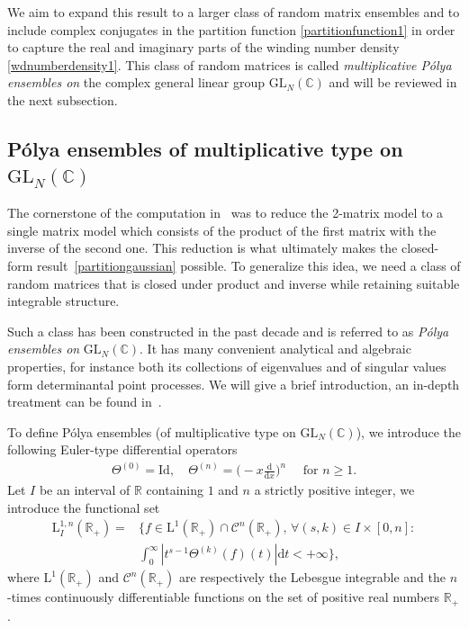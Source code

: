\documentclass[pdflatex,sn-mathphys-num]{sn-jnl}
\theoremstyle{thmstyleone}
\numberwithin{equation}{section}
\newcommand{\R}{\mathbb{R}}
\newcommand{\C}{\mathbb{C}}
\begin{document}
We aim to expand this result to a larger class of random matrix ensembles and to include complex conjugates in the partition function \eqref{partitionfunction1} in order to capture the real and imaginary parts of the winding number density \eqref{wdnumberdensity1}. This class of random matrices is called \textit{multiplicative P\'olya ensembles on} the complex general linear group $\mathrm{GL}_{N}(\C)$ and will be reviewed in the next subsection. 


\subsection{P\'olya ensembles of multiplicative type on $\mathrm{GL}_{N}(\C)$}\label{sec:polya}

The cornerstone of the computation in~\cite{hahnWindingNumberStatistics2023} was to reduce the 2-matrix model to a single matrix model which consists of the product of the first matrix with the inverse of the second one. This reduction is what ultimately makes the closed-form result~\eqref{partitiongaussian} possible. To generalize this idea, we need a class of random matrices that is closed under product and inverse while retaining suitable integrable structure.

Such a class has been constructed \cite{kieburgProductsRandomMatrices2019,forsterPolynomialEnsemblesPolya2021} in the past decade and is referred to as \textit{P\'olya ensembles on} $\mathrm{GL}_{N}\left(\C\right)$. It has many convenient analytical and algebraic properties, for instance both its collections of eigenvalues and of singular values form determinantal point processes.
We will give a brief introduction, an in-depth treatment can be found in~\cite{kieburgExactRelationSingular2016,kieburgProductsRandomMatrices2019,forsterPolynomialEnsemblesPolya2021}. 
 
To define P\'olya ensembles (of multiplicative type on $\mathrm{GL}_{N}\left(\C\right)$), we introduce the following Euler-type differential operators
\begin{align}
    \Theta^{\left ( 0 \right )}= \mathrm{Id},\quad\Theta^{\left ( n \right )}=\Big(-x\frac{\mathrm{d}}{\mathrm{d}x}\Big)^{n}\quad\text{ for }n\geq 1.
\end{align}
Let $I$ be an interval of $\R$ containing $1$ and $n$ a strictly positive integer, we introduce the functional set 
\begin{align}
    \mathrm{L}^{1,n}_{I}\left ( \R_{+} \right )=&\biggl\{ f\in\mathrm{L}^{1}\left ( \R_{+} \right )\cap\mathscr{C}^{n}\left( \R_{+} \right),\,\forall \left (s,k  \right )\in I\times\left [ 0,n \right ]:\nonumber\\
    &\int_{0}^{\infty}\left | t^{s-1}\Theta^{\left ( k \right )}\left (f  \right )\left ( t \right ) \right |\mathrm{d}t<+\infty \biggl \},
\end{align}
where $\mathrm{L}^{1}\left ( \R_{+} \right )$ and $\mathscr{C}^{n}\left( \R_{+} \right)$ are respectively the Lebesgue integrable and the $n$-times continuously differentiable functions on the set of positive real numbers $\R_+$.
\end{document}
